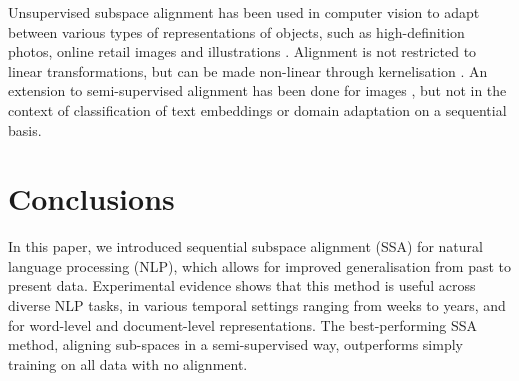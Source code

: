 \documentclass[letterpaper]{article} %
\begin{document}
Unsupervised subspace alignment has been used in computer vision to adapt between various types of representations of objects, such as high-definition photos, online retail images and illustrations \cite{fernando2013unsupervised}.%
Alignment is not restricted to linear transformations, but can be made non-linear through kernelisation \cite{aljundi2015landmarks}. %
An extension to semi-supervised alignment has been done for images \cite{yao2015semi}, but not in the context of classification of text embeddings or domain adaptation on a sequential basis. %


\section{Conclusions}

In this paper, we introduced sequential subspace alignment (SSA) for natural language processing (NLP), which allows for improved generalisation from past to present data. Experimental evidence shows that this method is useful across diverse NLP tasks, in various temporal settings ranging from weeks to years, and for word-level and document-level representations. The best-performing SSA method, aligning sub-spaces in a semi-supervised way, outperforms simply training on all data with no alignment.
\end{document}
